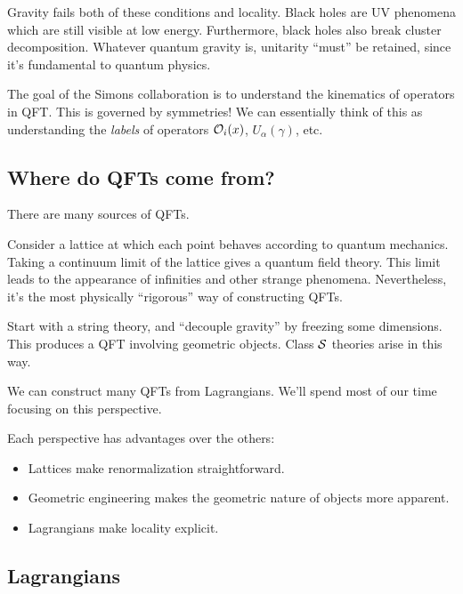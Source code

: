 Gravity fails both of these conditions and locality.
Black holes are UV phenomena which are still visible at low energy.
Furthermore, black holes also break cluster decomposition.
Whatever quantum gravity is, unitarity ``must'' be retained, since it's fundamental to quantum physics.

The goal of the Simons collaboration is to understand the kinematics of operators in QFT.
This is governed by symmetries!
We can essentially think of this as understanding the \emph{labels} of operators $\mathcal{O}_i(x)$, $U_\alpha(\gamma)$, etc.

\subsection{Where do QFTs come from?}

There are many sources of QFTs.

\begin{ex}[Lattices]
	Consider a lattice at which each point behaves according to quantum mechanics.
	Taking a continuum limit of the lattice gives a quantum field theory.
	This limit leads to the appearance of infinities and other strange phenomena.
	Nevertheless, it's the most physically ``rigorous'' way of constructing QFTs.
\end{ex}

\begin{ex}
	Start with a string theory, and ``decouple gravity'' by freezing some dimensions.
	This produces a QFT involving geometric objects.
	Class $\mathcal{S}$ theories arise in this way.
\end{ex}

\begin{ex}[Lagrangians]
	We can construct many QFTs from Lagrangians.
	We'll spend most of our time focusing on this perspective.
\end{ex}

Each perspective has advantages over the others:
\begin{itemize}
	\item Lattices make renormalization straightforward.
	\item Geometric engineering makes the geometric nature of objects more apparent.
	\item Lagrangians make locality explicit.
\end{itemize}
	
\subsection{Lagrangians}

